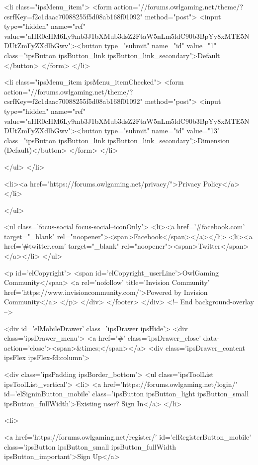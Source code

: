 				<li class="ipsMenu_item">
					<form action="//forums.owlgaming.net/theme/?csrfKey=f2c1daac70088255f5d08ab168f01092" method="post">
					<input type="hidden" name="ref" value="aHR0cHM6Ly9mb3J1bXMub3dsZ2FtaW5nLm5ldC90b3BpYy8xMTE5NDUtZmFyZXdlbGwv"><button type="submit" name="id" value="1" class="ipsButton ipsButton_link ipsButton_link_secondary">Default </button>
					</form>
				</li>
			
				<li class="ipsMenu_item ipsMenu_itemChecked">
					<form action="//forums.owlgaming.net/theme/?csrfKey=f2c1daac70088255f5d08ab168f01092" method="post">
					<input type="hidden" name="ref" value="aHR0cHM6Ly9mb3J1bXMub3dsZ2FtaW5nLm5ldC90b3BpYy8xMTE5NDUtZmFyZXdlbGwv"><button type="submit" name="id" value="13" class="ipsButton ipsButton_link ipsButton_link_secondary">Dimension (Default)</button>
					</form>
				</li>
			
			</ul>
</li>
	
	
		<li><a href="https://forums.owlgaming.net/privacy/">Privacy Policy</a></li>
	
	
</ul>	


<ul class='focus-social focus-social--iconOnly'>
	<li><a href='#facebook.com' target="_blank" rel="noopener"><span>Facebook</span></a></li>
<li><a href='#twitter.com' target="_blank" rel="noopener"><span>Twitter</span></a></li>
</ul>



<p id='elCopyright'>
	<span id='elCopyright_userLine'>OwlGaming Community</span>
	<a rel='nofollow' title='Invision Community' href='https://www.invisioncommunity.com/'>Powered by Invision Community</a>
</p>
				</div>
			</footer>
</div> <!-- End background-overlay -->
			
<div id='elMobileDrawer' class='ipsDrawer ipsHide'>
	<div class='ipsDrawer_menu'>
		<a href='#' class='ipsDrawer_close' data-action='close'><span>&times;</span></a>
		<div class='ipsDrawer_content ipsFlex ipsFlex-fd:column'>
			
				<div class='ipsPadding ipsBorder_bottom'>
					<ul class='ipsToolList ipsToolList_vertical'>
						<li>
							<a href='https://forums.owlgaming.net/login/' id='elSigninButton_mobile' class='ipsButton ipsButton_light ipsButton_small ipsButton_fullWidth'>Existing user? Sign In</a>
						</li>
						
							<li>
								
									<a href='https://forums.owlgaming.net/register/'  id='elRegisterButton_mobile' class='ipsButton ipsButton_small ipsButton_fullWidth ipsButton_important'>Sign Up</a>
								
